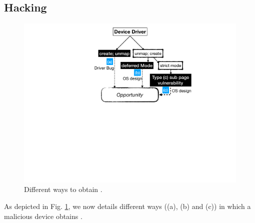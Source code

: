 \subsection{Hacking~\oportunity{}}\label{sec:shinfo}

\begin{figure}[t]
    \centering
    \includegraphics[width=\linewidth]{figs/road_to_op.pdf}
    \caption{Different ways to obtain \oportunity.}
    \label{fig:road_to_op}
\end{figure}

As depicted in Fig. \ref{fig:road_to_op}, we now details different ways ((a), (b) and (c)) in which a malicious device obtains \oportunity{}.

